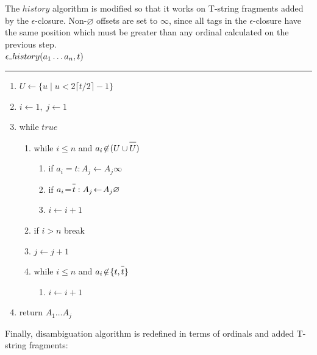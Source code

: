 \documentclass{article}
\newcommand{\Xset}{\!\leftarrow\!}
\newcommand{\Xund}{\rule{.4em}{.4pt}} %
\newcommand{\Xeq}{\!=\!}
\newcommand*{\Xbar}[1]{\overline{#1\vphantom{\bar{#1}}}}
\theoremstyle{definition}
\begin{document}
\begin{multicols}{2}
    \bigskip

The $history$ algorithm is modified so that it works on T-string fragments added by the $\epsilon$-closure.
Non-$\varnothing$ offsets are set to $\infty$, since all tags in the $\epsilon$-closure have the same position
which must be greater than any ordinal calculated on the previous step.
\\

    $\epsilon \Xund history (a_1 \dots a_n, t)$
    \hrule
    \begin{enumerate}[leftmargin=0in]
        \smallskip
        \item[] $U \Xset \{ u \mid u < 2 \lceil t / 2 \rceil \!-\! 1 \}$
        \item[] $i \Xset 1, \; j \Xset 1$

        \item[] while $true$
        \begin{enumerate}
            \item[] while $i \leq n$ and $a_i \!\not\in\! (U \cup \Xbar{U})$
            \begin{enumerate}
                \item[] if $a_i \Xeq t: A_j \Xset A_j \infty$
                \item[] if $a_i \Xeq \Xbar{t}: A_j \Xset A_j \varnothing$
                \item[] $i \Xset i \!+\! 1$
            \end{enumerate}

            \item[] if $i \!>\! n$ break
            \item[] $j \Xset j \!+\! 1$

            \item[] while $i \leq n$ and $a_i \!\not\in\! \{t, \Xbar{t}\}$
            \begin{enumerate}
                \item[] $i \Xset i \!+\! 1$
            \end{enumerate}

        \end{enumerate}
        \item[] return $A_1 \dots A_j$
    \end{enumerate}

    \bigskip

Finally, disambiguation algorithm is redefined in terms of ordinals and added T-string fragments:
\\


\end{multicols}
\end{document}
